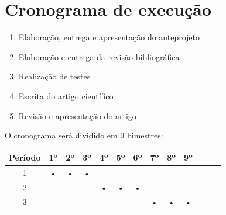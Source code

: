 \section{Cronograma de execução}
\begin{enumerate}
    \item Elaboração, entrega e apresentação do anteprojeto
    \item Elaboração e entrega da revisão bibliográfica
    \item Realização de testes 
    \item Escrita do artigo científico
    \item Revisão e apresentação do artigo
\end{enumerate}

O cronograma será dividido em 9 bimestres:

\begin{table}[H]
    \centering
    \begin{tabular}{|c|c|c|c|c|c|c|c|c|c|c|c|c|}
    \hline
        Período & 1º & 2º & 3º & 4º & 5º & 6º & 7º & 8º & 9º\\
    \hline
        1 & • & • & • &  & &  &  &  & \\
    \hline
        2 &  &  &  & • & • & • &  &  &  \\
    \hline
        3 &  &  &  &  &   &  & • & • & • \\
    \hline
    \end{tabular}
\end{table}